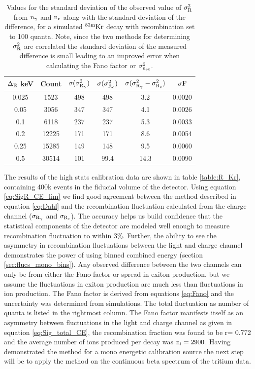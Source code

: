 \begin{table}[h!]
\begin{center}
\tabcolsep=0.11cm
\begin{tabular}{|c|c|c|c|c|c|}
\hline
$\rm \Delta_E$ keV & Count & $\rm \sigma (\sigma_{R_{\gamma}}^2 ) $ & $\rm \sigma (\sigma_{R_{e}}^2 )$  & $\rm \sigma (\sigma_{R_{\gamma}}^2 - \sigma_{R_{e}}^2 ) $ & $\rm \sigma F$ \\ \hline
0.025 	& 1523		&498		& 498	  	& 3.2	&	 0.0020\\ \hline
0.05 	& 3056 		&347		& 347	  	& 4.1	&	 0.0026\\ \hline
0.1 		& 6118  	&237		& 237		& 5.3	&	 0.0033\\ \hline
0.2 		& 12225  	&171		& 171	 	& 8.6	&	 0.0054\\ \hline
0.25 	& 15285 	&149		& 148		& 9.5 	&	 0.0060\\ \hline
0.5		& 30514 	&101		& 99.4  		&14.3	&	 0.0090 \\ \hline
\end{tabular}
\caption{Values for the standard deviation of the observed value of $\rm \sigma_R^2$ from $\rm n_\gamma$ and $\rm n_e$ along with the standard deviation of the difference, for a simulated $\rm^{83m}Kr$ decay with recombination set to 100 quanta.  Note, since the two methods for determining $\rm \sigma_R^2$  are correlated the standard deviation of the measured difference is small leading to an improved error when calculating the Fano factor or $\rm \sigma_{n_{ex}}^2$.}
\label{table:Simulated_Sigmas_R_100}
\end{center}
\end{table}


The results of the high stats calibration data are shown in table \ref{table:R_Kr}, containing 400k events in the fiducial volume of the detector. Using equation \ref{eq:SigR_CE_lim} we find good agreement between the method described in equation \ref{eq:Dahl} and the recombination fluctuation calculated from the charge channel ($\rm \sigma_{R_\gamma}$ and $\rm \sigma_{R_e}$).  The accuracy helps us build confidence that the statistical components of the detector are modeled well enough to measure recombination fluctuation to within 3\%. Further, the ability to see the asymmetry in recombination fluctuations between the light and charge channel demonstrates the power of using binned combined energy (section \ref{sec:flucs_mono_bins}). Any observed difference between the two channels  can only be from either the Fano factor or spread in exiton production, but we assume the fluctuations in exiton production are much less than fluctuations in ion production. The Fano factor is derived from equations \ref{eq:Fano} and the uncertainty was determined from simulations. The total fluctuation as number of quanta is listed in the rightmost column. The Fano factor manifests itself as an asymmetry between fluctuations in the light and charge channel as given in equation \ref{eq:Sig_total_CE}, the recombination fraction was found to be r= 0.772 and the average number of ions produced per decay was $\rm n_i=2900$. 
Having demonstrated the method for a mono energetic calibration source the next step will be to apply the method on the continuous beta spectrum of the tritium data.



